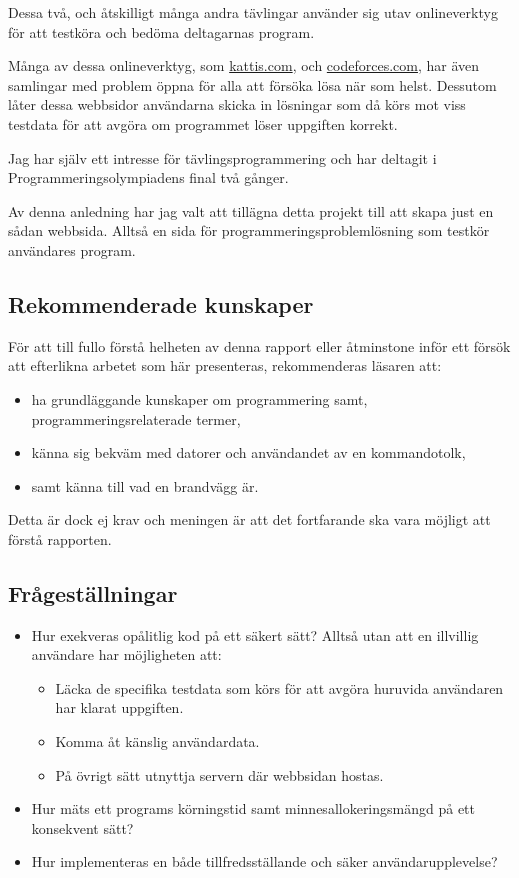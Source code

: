 \documentclass{article}
\begin{document}
Dessa två, och åtskilligt många andra tävlingar använder sig utav onlineverktyg
för att testköra och bedöma deltagarnas program.

Många av dessa onlineverktyg, som \href{https://open.kattis.com}{kattis.com},
och \href{https://codefoces.com}{codeforces.com}, har även samlingar med problem
öppna för alla att försöka lösa när som helst. Dessutom låter dessa webbsidor
användarna skicka in lösningar som då körs mot viss testdata för att avgöra om
programmet löser uppgiften korrekt.

Jag har själv ett intresse för tävlingsprogrammering och har deltagit i
Programmeringsolympiadens final två gånger.

Av denna anledning har jag valt att tillägna detta projekt till att skapa just
en sådan webbsida. Alltså en sida för programmeringsproblemlösning som testkör
användares program.

\subsection{Rekommenderade kunskaper}

För att till fullo förstå helheten av denna rapport eller åtminstone inför ett
försök att efterlikna arbetet som här presenteras, rekommenderas läsaren att:

\begin{itemize}
	\item ha grundläggande kunskaper om programmering samt,
		programmeringsrelaterade termer,
	\item känna sig bekväm med datorer och användandet av en kommandotolk,
	\item samt känna till vad en brandvägg är.
\end{itemize}

Detta är dock ej krav och meningen är att det fortfarande ska vara möjligt att
förstå rapporten.

\subsection{Frågeställningar}

\begin{itemize}
	\item Hur exekveras opålitlig kod på ett säkert sätt? Alltså utan att en
		illvillig användare har möjligheten att:
		\begin{itemize}
			\item Läcka de specifika testdata som körs för att avgöra huruvida
				användaren har klarat uppgiften.
			\item Komma åt känslig användardata.
			\item På övrigt sätt utnyttja servern där webbsidan hostas.
		\end{itemize}
	\item
		Hur mäts ett programs körningstid samt minnesallokeringsmängd på ett
		konsekvent sätt?
	\item
		Hur implementeras en både tillfredsställande och säker
		användarupplevelse?

\end{itemize}
\end{document}
